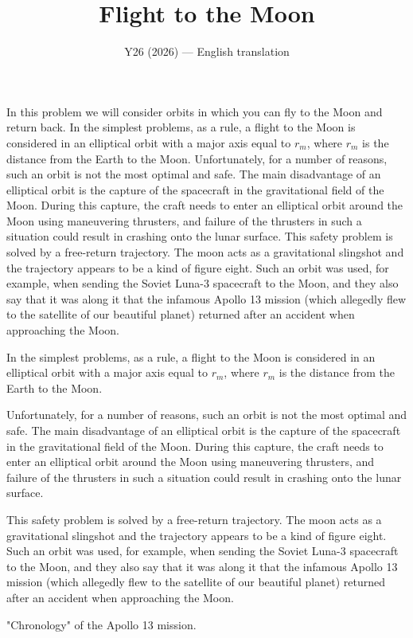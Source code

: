 \documentclass[11pt,a4paper]{article}
\title{\textbf{Flight to the Moon}}
\author{\normalsize Y26 (2026) --- English translation}
\date{}
\begin{document}
\maketitle

In this problem we will consider orbits in which you can fly to the Moon and return back. In the simplest problems, as a rule, a flight to the Moon is considered in an elliptical orbit with a major axis equal to $r_m$, where $r_m$ is the distance from the Earth to the Moon. Unfortunately, for a number of reasons, such an orbit is not the most optimal and safe. The main disadvantage of an elliptical orbit is the capture of the spacecraft in the gravitational field of the Moon. During this capture, the craft needs to enter an elliptical orbit around the Moon using maneuvering thrusters, and failure of the thrusters in such a situation could result in crashing onto the lunar surface. This safety problem is solved by a free-return trajectory. The moon acts as a gravitational slingshot and the trajectory appears to be a kind of figure eight. Such an orbit was used, for example, when sending the Soviet Luna-3 spacecraft to the Moon, and they also say that it was along it that the infamous Apollo 13 mission (which allegedly flew to the satellite of our beautiful planet) returned after an accident when approaching the Moon.

In the simplest problems, as a rule, a flight to the Moon is considered in an elliptical orbit with a major axis equal to $r_m$, where $r_m$ is the distance from the Earth to the Moon.

Unfortunately, for a number of reasons, such an orbit is not the most optimal and safe. The main disadvantage of an elliptical orbit is the capture of the spacecraft in the gravitational field of the Moon. During this capture, the craft needs to enter an elliptical orbit around the Moon using maneuvering thrusters, and failure of the thrusters in such a situation could result in crashing onto the lunar surface.

This safety problem is solved by a free-return trajectory. The moon acts as a gravitational slingshot and the trajectory appears to be a kind of figure eight. Such an orbit was used, for example, when sending the Soviet Luna-3 spacecraft to the Moon, and they also say that it was along it that the infamous Apollo 13 mission (which allegedly flew to the satellite of our beautiful planet) returned after an accident when approaching the Moon.

"Chronology" of the Apollo 13 mission.
\end{document}
